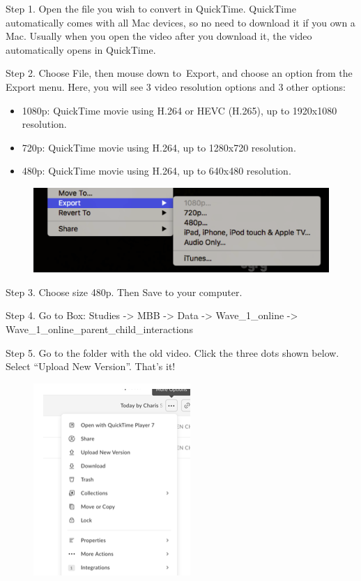 \documentclass[]{book}
\providecommand{\tightlist}{%
  \setlength{\itemsep}{0pt}\setlength{\parskip}{0pt}}
\begin{document}
Step 1. Open the file you wish to convert in QuickTime. QuickTime automatically comes with all Mac devices, so no need to download it if you own a Mac. Usually when you open the video after you download it, the video automatically opens in QuickTime.

Step 2. Choose File, then mouse down to~Export, and choose an option from the Export menu.
Here, you will see 3 video resolution options and 3 other options:

\begin{itemize}
\tightlist
\item
  1080p: QuickTime movie using H.264 or HEVC (H.265), up to 1920x1080 resolution.
\item
  720p: QuickTime movie using H.264, up to 1280x720 resolution.
\item
  480p: QuickTime movie using H.264, up to 640x480 resolution.
\end{itemize}

\begin{figure}
\centering
\includegraphics{images/lab_protocols/video_resolution/1.png}
\caption{}
\end{figure}

Step 3. Choose size 480p. Then Save to your computer.

Step 4. Go to Box: Studies -\textgreater{} MBB -\textgreater{} Data -\textgreater{} Wave\_1\_online -\textgreater{} Wave\_1\_online\_parent\_child\_interactions

Step 5. Go to the folder with the old video. Click the three dots shown below. Select ``Upload New Version''. That's it!

\begin{figure}
\centering
\includegraphics{images/lab_protocols/video_resolution/2.png}
\caption{}
\end{figure}
\end{document}
